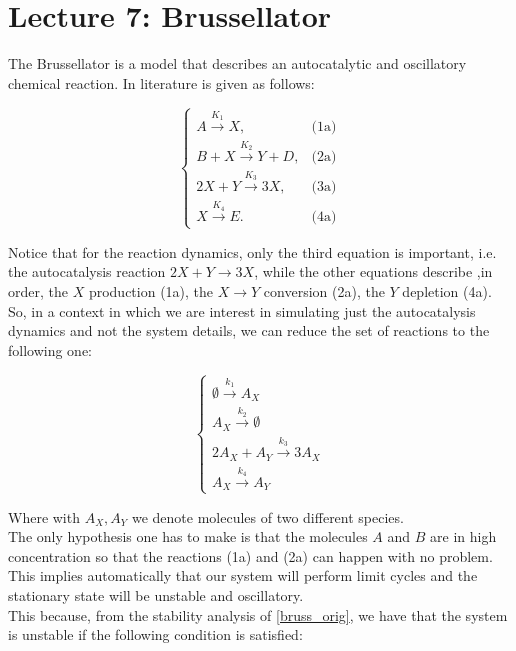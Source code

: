 \chapter*{Lecture 7: Brussellator}

The Brussellator is a model that describes an autocatalytic and oscillatory chemical reaction. In literature is given as follows:

\begin{equation}
    \begin{cases} 
        A \xrightarrow{K_1} X, & \text{(1a)} \\ 
        B + X \xrightarrow{K_2} Y + D, & \text{(2a)} \\
         2X + Y \xrightarrow{K_3} 3X, & \text{(3a)} \\ 
         X \xrightarrow{K_4} E. & \text{(4a)}     
    \end{cases}    
\label{bruss_orig}
\end{equation}

Notice that for the reaction dynamics, only the third equation is important, i.e. the autocatalysis reaction $2X + Y \rightarrow 3X$, while
the other equations describe ,in order, the $X$ production (1a), the $X \to Y$ conversion (2a), the $Y$ depletion (4a). \\
So, in a context in which we are interest in simulating just the autocatalysis dynamics and not the system details, we can reduce 
the set of reactions to the following one:

$$
\begin{cases}
    \emptyset\xrightarrow{k_1}A_X \\
    A_X\xrightarrow{k_2}\emptyset  \\
    2A_X+A_Y \xrightarrow{k_3} 3A_X\\
    A_X\xrightarrow{k_4} A_Y
\end{cases}
$$

Where with $A_X,A_Y$ we denote molecules of two different species. \\ The only hypothesis one has to make is that the molecules $A$ and $B$ are
in high concentration so that the reactions (1a) and (2a) can happen with no problem. \\
This implies automatically that our system will perform limit cycles and the stationary state will be unstable and oscillatory.\\
This because, from the stability analysis of \ref{bruss_orig}, we have that the system is unstable if the following condition is satisfied:

